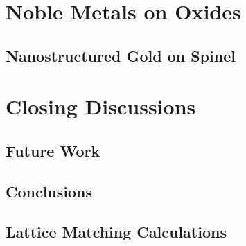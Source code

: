 \documentclass[letterpaper,12pt,twoside,openright]{report}
\begin{document}
\part{Noble Metals on Oxides}
\chapter{Nanostructured Gold on Spinel}


\part{Closing Discussions}
\chapter{Future Work}


\chapter{Conclusions}


\printbibliography{}

\appendix
\chapter{Lattice Matching Calculations}
\label{apndx:lattice-matches}

\end{document}
